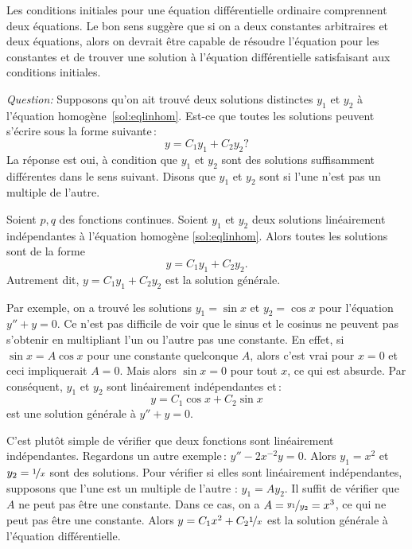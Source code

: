 \medskip

Les conditions initiales pour une équation différentielle ordinaire comprennent deux équations. Le bon sens suggère que si on a deux constantes arbitraires et deux équations, alors on devrait être capable de résoudre l'équation pour les constantes et de trouver une solution à l'équation différentielle satisfaisant aux conditions initiales. 

\emph{Question:} Supposons qu'on ait trouvé deux solutions distinctes $y_1$ et $y_2$ à l'équation homogène~\eqref{sol:eqlinhom}.  Est-ce que toutes les solutions peuvent s'écrire sous la forme suivante\,:
%
\begin{equation*}
y = C_1 y_1 + C_2 y_2?
\end{equation*}
%
La réponse est oui, à condition que $y_1$ et $y_2$ sont des solutions suffisamment différentes dans le sens suivant.  Disons que $y_1$ et $y_2$ sont \emph{} si l'une n'est pas un multiple de l'autre.

\begin{theorem}
Soient $p, q$ des fonctions continues.
Soient $y_1$ et $y_2$ deux solutions linéairement indépendantes à l'équation homogène \eqref{sol:eqlinhom}. 
Alors toutes les solutions sont de la forme 
\begin{equation*}
y = C_1 y_1 + C_2 y_2 .
\end{equation*}
Autrement dit, $y = C_1 y_1 + C_2 y_2$ est la solution générale.
\end{theorem}

Par exemple, on a trouvé les solutions 
$y_1 = \sin x$ et $y_2 = \cos x$ pour l'équation $y'' + y = 0$.  Ce n'est pas difficile de voir que le sinus et le cosinus ne peuvent pas s'obtenir en multipliant l'un ou l'autre pas une constante.
En effet, si $\sin x = A \cos x$ pour une constante quelconque $A$,
alors c'est vrai pour $x=0$ et ceci impliquerait  $A = 0$.  Mais alors $\sin x = 0$ pour tout 
$x$, ce qui est absurde.
Par conséquent, $y_1$ et $y_2$ sont linéairement indépendantes et\,: 
\begin{equation*}
y = C_1 \cos x + C_2 \sin x 
\end{equation*}
est une solution générale à $y'' + y = 0$.


C'est plutôt simple de vérifier que deux fonctions sont linéairement indépendantes. Regardons un autre exemple\,:    $y''-2x^{-2}y = 0$.  Alors $y_1 = x^2$ et $y_2 =
\nicefrac{1}{x}$ sont des solutions.  Pour vérifier si elles sont linéairement indépendantes, supposons que l'une est un  multiple de l'autre :  $y_1 = A y_2$.  Il suffit de vérifier que  $A$ ne peut pas être une constante.  Dans ce cas, on a $A =
\nicefrac{y_1}{y_2} = x^3$, ce qui ne peut pas être une constante. Alors $y = C_1 x^2 + C_2 \nicefrac{1}{x}$ est la solution générale à l'équation différentielle.

